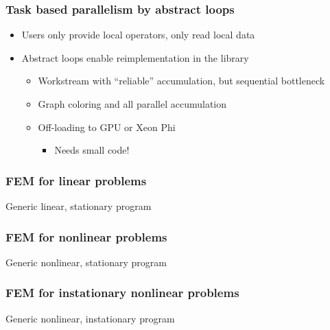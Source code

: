 \begin{frame}
  \frametitle{Task based parallelism by abstract loops}
  \begin{itemize}
  \item Users only provide local operators, only read local data
  \item Abstract loops enable reimplementation in the library
    \begin{itemize}
    \item Workstream with ``reliable'' accumulation, but sequential bottleneck
    \item Graph coloring and all parallel accumulation
    \item Off-loading to GPU or Xeon Phi
      \begin{itemize}
      \item Needs small code!
      \end{itemize}
    \end{itemize}
  \end{itemize}
\end{frame}


\begin{frame}[fragile]
  \frametitle{FEM for linear problems}
  \begin{block}{Generic linear, stationary program}
    
  \end{block}
\end{frame}

\begin{frame}[fragile]
  \frametitle{FEM for nonlinear problems}
  \begin{block}{Generic nonlinear, stationary program}
    
  \end{block}
\end{frame}

\begin{frame}[fragile]
  \frametitle{FEM for instationary nonlinear problems}
  \begin{block}{Generic nonlinear, instationary program}
    
  \end{block}
\end{frame}

